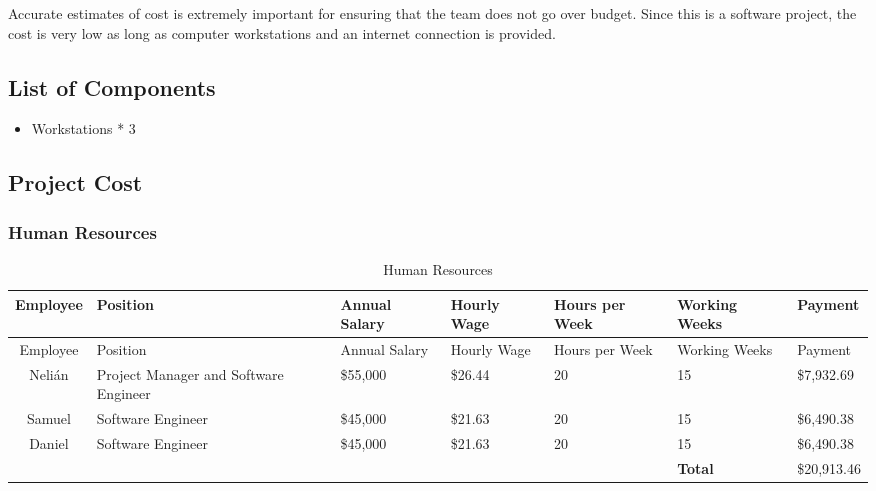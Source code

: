 Accurate estimates of cost is extremely important for ensuring that the team
does not go over budget. Since this is a software project, the cost is very low
as long as computer workstations and an internet connection is provided.
\subsection{List of Components}
\begin{itemize}
\item Workstations * 3
\end{itemize}
\subsection{Project Cost}
\subsubsection{Human Resources}
\begin{center}
\setlength{\extrarowheight}{1.5pt}
  \begin{longtable}{|c|p{4cm}|p{2cm}|p{2cm}|p{1cm}|p{1.5cm}|p{2cm}|}
 \caption{Human Resources} \\
   \hline
  
  \centering Employee & Position & Annual Salary & Hourly Wage & Hours per Week & Working Weeks & Payment \\
  \hline \hline \endfirsthead
  
     \hline

	\centering Employee & Position & Annual Salary & Hourly Wage & Hours per Week & Working Weeks & Payment \\
	\hline \hline \endhead
  
  \endfoot  

    Nelián & Project Manager and Software Engineer & \$55,000  & \$26.44  & 20    & 15    & \$7,932.69  \\ \hline
    Samuel & Software Engineer & \$45,000  & \$21.63  & 20    & 15    & \$6,490.38  \\ \hline
    Daniel & Software Engineer & \$45,000  & \$21.63  & 20    & 15    & \$6,490.38  \\ \hline
    \multicolumn{1}{l}{}      & \multicolumn{1}{l}{}      & \multicolumn{1}{l}{}      & \multicolumn{1}{l}{}      & \multicolumn{1}{l}{}      & \multicolumn{1}{l}{\textbf{Total}} & \multicolumn{1}{l}{\$20,913.46}  \\
          
           \end{longtable}
\end{center}
